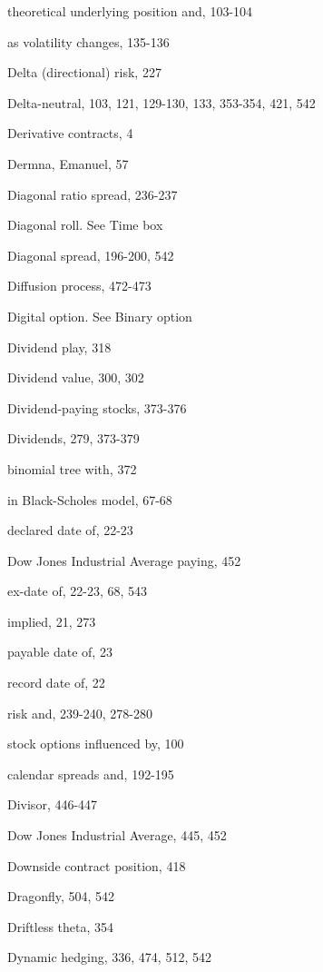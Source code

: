 \noindent theoretical underlying position and, 103-104\par
\noindent as volatility changes, 135-136\par
\noindent Delta (directional) risk, 227\par
Delta-neutral, 103, 121, 129-130, 133, 353-354, 421, 542\par
\noindent Derivative contracts, 4\par
\noindent Dermna, Emanuel, 57\par
\noindent Diagonal ratio spread, 236-237\par
\noindent Diagonal roll. See Time box\par
\noindent Diagonal spread, 196-200, 542\par
\noindent Diffusion process, 472-473\par
\noindent Digital option. See Binary option\par
\noindent Dividend play, 318\par
\noindent Dividend value, 300, 302\par
\noindent Dividend-paying stocks, 373-376\par
\noindent Dividends, 279, 373-379\par
\noindent binomial tree with, 372\par
\noindent in Black-Scholes model, 67-68\par
\noindent declared date of, 22-23\par
\noindent Dow Jones Industrial Average paying, 452\par
\noindent ex-date of, 22-23, 68, 543\par
\noindent implied, 21, 273\par
\noindent payable date of, 23\par
\noindent record date of, 22\par
\noindent risk and, 239-240, 278-280\par
\noindent stock options influenced by, 100\par
\noindent calendar spreads and, 192-195\par
\noindent Divisor, 446-447\par
\noindent Dow Jones Industrial Average, 445, 452\par
\noindent Downside contract position, 418\par
\noindent Dragonfly, 504, 542\par
\noindent Driftless theta, 354\par
\noindent Dynamic hedging, 336, 474, 512, 542\par

